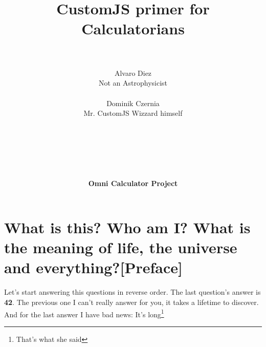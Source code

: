 \documentclass[11pt,a4paper,oldfontcommands]{memoir}
\begin{document}
%
%
\thispagestyle{empty}

{%

\centering
\title{ \normalsize \textsc{}
		\\ [2.0cm]
		\hline \vspace{10pt} \\
		\huge \textbf{CustomJS primer for Calculatorians\textsuperscript{\textregistered}} \vspace{5pt}
		\textbf{\hline}{\hline} \\ [0.5cm]
		\large \vspace{200pt}\\}		}
		


\author{\LARGE Alvaro Diez \\
		Not an Astrophysicist\texttrademark \\ \\
		\LARGE Dominik Czernia \\
		Mr. CustomJS Wizzard himself \\ \\ \\ \\ \\ \\ \\
		\LARGE {\textbf{Omni Calculator Project}} \vspace{-50pt}
} 
		
\maketitle
\noalign
\clearpage

\tableofcontents

\clearpage


\chapter{What is this? Who am I? What is the meaning of life, the universe and everything?[Preface]}
\label{preface}

Let's start answering this questions in reverse order. The last question's answer is \textbf{42}. The previous one I can't really answer for you, it takes a lifetime to discover. And for the last answer I have bad news: It's long\footnote{That's what she said}
\end{document}
